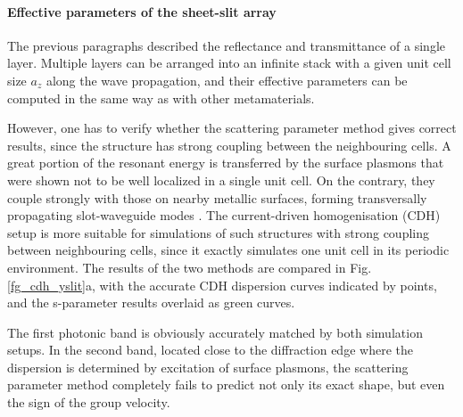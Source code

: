 \paragraph{Effective parameters of the sheet-slit array}%
The previous paragraphs described the reflectance and transmittance of a single layer. Multiple layers can be arranged into an infinite stack with a given unit cell size $a_z$ along the wave propagation, and their effective parameters can be computed in the same way as with other metamaterials. 

However, one has to verify whether the scattering parameter method gives correct results, since the structure has strong coupling between the neighbouring cells. A great portion of the resonant energy is transferred by the surface plasmons that were shown not to be well localized in a single unit cell. On the contrary, they couple strongly with those on nearby metallic surfaces, forming transversally propagating slot-waveguide modes \cite{weiner2011electromagnetics}.
The current-driven homogenisation (CDH) setup is more suitable for simulations of such structures  with strong coupling between neighbouring cells, since it exactly simulates one unit cell in its periodic environment. The results of the two methods are compared in Fig. \ref{fg_cdh_yslit}a, with the accurate CDH dispersion curves indicated by points, and the s-parameter results overlaid as green curves.  %

The first photonic band is obviously accurately matched by both simulation setups. In the second band, located close to the diffraction edge where the dispersion is determined by excitation of surface plasmons, the scattering parameter method completely fails to predict not only its exact shape, but even the sign of the group velocity. 


